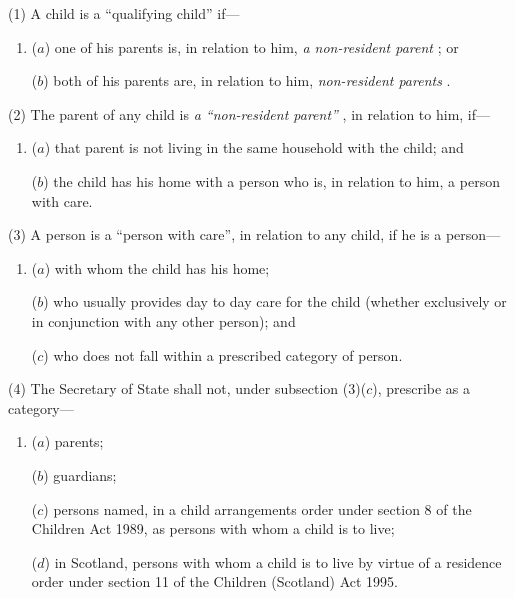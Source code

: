 \documentclass[12pt,a4paper]{article}
\begin{document}
(1) A child is a “qualifying child” if—
\begin{enumerate}\item[]
($a$) one of his parents is, in relation to him, 
\emph{a non-resident parent}%
; or

($b$) both of his parents are, in relation to him, 
\emph{non-resident parents}%
.
\end{enumerate}

(2) The parent of any child is 
\emph{a ``non-resident parent''}%
, in relation to him, if—
\begin{enumerate}\item[]
($a$) that parent is not living in the same household with the child; and

($b$) the child has his home with a person who is, in relation to him, a person with care.
\end{enumerate}

(3) A person is a “person with care”, in relation to any child, if he is a person—
\begin{enumerate}\item[]
($a$) with whom the child has his home;

($b$) who usually provides day to day care for the child (whether exclusively or in conjunction with any other person); and

($c$) who does not fall within a prescribed category of person.
\end{enumerate}

(4) The Secretary of State shall not, under subsection (3)($c$), prescribe as a category—
\begin{enumerate}\item[]
($a$) parents;

($b$) guardians;


($c$) persons named, in a child arrangements order under section 8 of the Children Act 1989, as persons with whom a child is to live;

($d$) in Scotland, persons 
with whom a child is to live by virtue of a residence order under section 11 of the Children (Scotland) Act 1995.  %
\end{enumerate}
\end{document}
